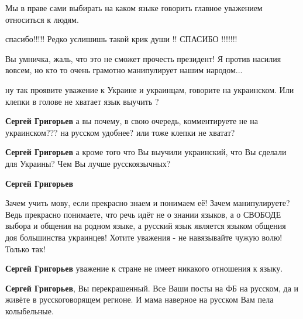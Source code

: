 \begin{itemize}
Мы в праве сами выбирать на каком языке говорить главное уважением относиться к людям.

спасибо!!!!! Редко услишишь такой крик души !! СПАСИБО !!!!!!!

Вы умничка, жаль, что это не сможет прочесть президент! Я против насилия вовсем, но кто то очень грамотно манипулирует нашим народом...

ну так проявите уважение к Украине и украинцам, говорите на украинском. Или клепки в голове не хватает язык выучить ?

\begin{itemize}

\textbf{Сергей Григорьев} а вы почему, в свою очередь, комментируете не на украинском??? на русском удобнее? или тоже клепки не хватат?

\textbf{Сергей Григорьев} а кроме того что Вы выучили украинский, что Вы сделали для Украины? Чем Вы лучше русскоязычных?

\textbf{Сергей Григорьев} 

Зачем учить мову, если прекрасно знаем и понимаем её!
Зачем манипулируете? Ведь прекрасно понимаете, что речь идёт не о знании
языков, а о СВОБОДЕ выбора и общения на родном языке, а русский язык является
языком общения доя большинства украинцев!  Хотите уважения - не навязывайте
чужую волю! Только так!


\textbf{Сергей Григорьев} уважение к стране не имеет никакого отношения к языку.

\textbf{Сергей Григорьев}, Вы перекрашенный. Все Ваши посты на ФБ на русском, да и живёте в русскоговорящем регионе. И мама наверное на русском Вам пела колыбельные.


\end{itemize}
\end{itemize}
